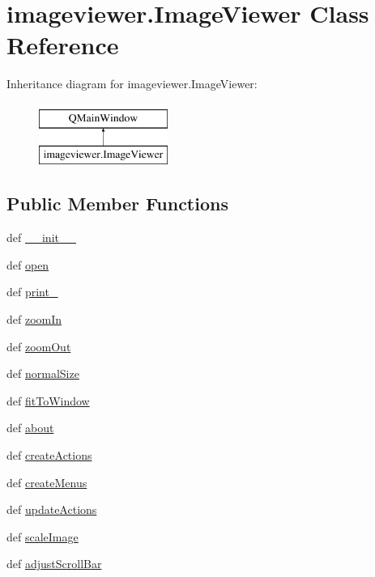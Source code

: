 \hypertarget{classimageviewer_1_1ImageViewer}{}\section{imageviewer.\+Image\+Viewer Class Reference}
\label{classimageviewer_1_1ImageViewer}
Inheritance diagram for imageviewer.\+Image\+Viewer\+:\begin{figure}[H]
\begin{center}
\leavevmode
\includegraphics[height=2.000000cm]{classimageviewer_1_1ImageViewer}
\end{center}
\end{figure}
\subsection*{Public Member Functions}
\begin{DoxyCompactItemize}
\item 
def \hyperlink{classimageviewer_1_1ImageViewer_ac057a354980e0ba678efa121c509094f}{\+\_\+\+\_\+init\+\_\+\+\_\+}
\item 
def \hyperlink{classimageviewer_1_1ImageViewer_a63122cfebf6bd1b980176b98b8d2ba17}{open}
\item 
def \hyperlink{classimageviewer_1_1ImageViewer_a000e43c3fadbb95dfce83d7813c32a4a}{print\+\_\+}
\item 
def \hyperlink{classimageviewer_1_1ImageViewer_abe832b25ce11e8b2af38b7e3b04859c8}{zoom\+In}
\item 
def \hyperlink{classimageviewer_1_1ImageViewer_abcfc5bd168ef9ba52df4cbd9e507d845}{zoom\+Out}
\item 
def \hyperlink{classimageviewer_1_1ImageViewer_a53da52743029b796f00c408ecf4a2571}{normal\+Size}
\item 
def \hyperlink{classimageviewer_1_1ImageViewer_a1458f0d85f3db61ee1b6eb69821375cc}{fit\+To\+Window}
\item 
def \hyperlink{classimageviewer_1_1ImageViewer_af44ad678f910ff32f765cff0a6ef1e47}{about}
\item 
def \hyperlink{classimageviewer_1_1ImageViewer_ace3a786507e0f211240967c78a7d602c}{create\+Actions}
\item 
def \hyperlink{classimageviewer_1_1ImageViewer_ae0b35a0b652c3dd07e61098144be616e}{create\+Menus}
\item 
def \hyperlink{classimageviewer_1_1ImageViewer_ad068c8fa61f4a8ce730d7736dfa6464b}{update\+Actions}
\item 
def \hyperlink{classimageviewer_1_1ImageViewer_a1338b4b380f4955004f54c90f9c76ae3}{scale\+Image}
\item 
def \hyperlink{classimageviewer_1_1ImageViewer_ae47cebe7a8d78f40b8a461eef742d24c}{adjust\+Scroll\+Bar}
\end{DoxyCompactItemize}
